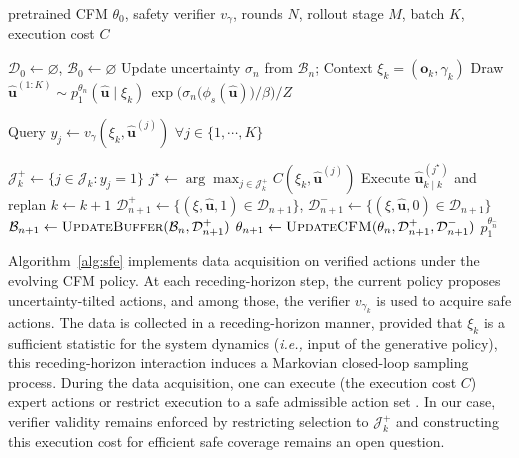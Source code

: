 \documentclass[letterpaper, 10 pt, conference]{ieeeconf}
\begin{document}
\begin{algorithm}[t]
\caption{Safe Flow Expansion}
\label{alg:sfe}
\small
\begin{algorithmic}[0]
\Require pretrained CFM ${\theta_0}$, safety verifier $v_\gamma$, rounds $N$, rollout stage $M$, batch $K$, execution cost $C$

\State $\mathcal D_0\gets\varnothing$, $\mathcal B_0\gets\varnothing$
    \State Update uncertainty $\sigma_n$ from $\mathcal B_n$;
        \State Context $\xi_k=(\mathbf o_k,\gamma_k)$
        \State Draw $\hat{\mathbf u}^{(1:K)} \sim p_1^{\theta_n}(\mathbf{\hat u}\mid \xi_k)\,\exp\!\Big(\sigma_n\big(\phi_s(\mathbf{\hat u})\big)/\beta\Big)/Z$
        
        \State Query $y_j\gets
        v_\gamma(\xi_k,\hat{\mathbf u}^{(j)})$ 
        $\forall j\in\{1,\cdots,K\}$ 

        \State $\mathcal J_k^+\gets
        \{j\in\mathcal J_k:y_j=1\}$
        \State $j^\star\gets
        \arg\max_{j\in\mathcal J_k^+}
        C(\xi_k,\hat{\mathbf u}^{(j)})$
        \State Execute $\hat{\mathbf u}^{(j^\star)}_{k\mid k}$ and replan $k\gets k+1$
    \EndWhile
    \State $\mathcal D_{n+1}^{+}\gets
    \{(\xi,\hat{\mathbf u},1)\in\mathcal D_{n+1}\}$, $\mathcal D_{n+1}^{-}\gets
    \{(\xi,\hat{\mathbf u},0)\in\mathcal D_{n+1}\}$
    \State $\mathcal B_{n+1}\gets
    \textsc{UpdateBuffer}(\mathcal B_n,\mathcal D_{n+1}^{+})$
    \State $\theta_{n+1}\gets
    \textsc{UpdateCFM}(\theta_n,\mathcal D_{n+1}^{+},
    \mathcal D_{n+1}^{-})$
\EndFor
\State \Return $p_1^{\theta_{\hat n}}$
\end{algorithmic}
\end{algorithm}

Algorithm~\ref{alg:sfe} implements data acquisition on verified actions under the evolving CFM policy. At each receding-horizon step, the current policy proposes uncertainty-tilted actions, and among those, the verifier \(v_{\gamma_k}\) is used to acquire safe actions. The data is collected in a receding-horizon manner, provided that \(\xi_k\) is a sufficient statistic for the system dynamics (\textit{i.e.,} input of the generative policy), this receding-horizon interaction induces a Markovian closed-loop sampling process. During the data acquisition, one can execute (the execution cost \(C\)) expert actions \cite{ross2011reduction} or restrict execution to a safe admissible action set \cite{alshiekh2018safe}. In our case, verifier validity remains enforced by restricting selection to \(\mathcal J_k^+\) and constructing this execution cost for efficient safe coverage remains an open question. 
\end{document}
